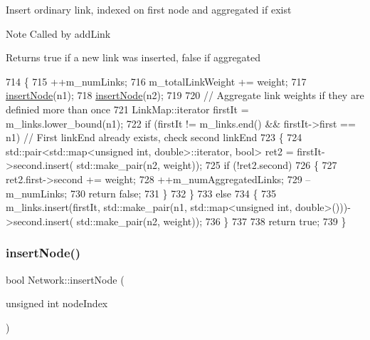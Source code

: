 Insert ordinary link, indexed on first node and aggregated if exist \begin{DoxyNote}{Note}
Called by add\+Link 
\end{DoxyNote}
\begin{DoxyReturn}{Returns}
true if a new link was inserted, false if aggregated 
\end{DoxyReturn}

\begin{DoxyCode}
714 \{
715     ++m\_numLinks;
716     m\_totalLinkWeight += weight;
717     \mbox{\hyperlink{classNetwork_a121d0db867b29c99e6e95ef960fcd56f}{insertNode}}(n1);
718     \mbox{\hyperlink{classNetwork_a121d0db867b29c99e6e95ef960fcd56f}{insertNode}}(n2);
719 
720     \textcolor{comment}{// Aggregate link weights if they are definied more than once}
721     LinkMap::iterator firstIt = m\_links.lower\_bound(n1);
722     \textcolor{keywordflow}{if} (firstIt != m\_links.end() && firstIt->first == n1) \textcolor{comment}{// First linkEnd already exists, check second
       linkEnd}
723     \{
724         std::pair<std::map<unsigned int, double>::iterator, \textcolor{keywordtype}{bool}> ret2 = firstIt->second.insert(
      std::make\_pair(n2, weight));
725         \textcolor{keywordflow}{if} (!ret2.second)
726         \{
727             ret2.first->second += weight;
728             ++m\_numAggregatedLinks;
729             --m\_numLinks;
730             \textcolor{keywordflow}{return} \textcolor{keyword}{false};
731         \}
732     \}
733     \textcolor{keywordflow}{else}
734     \{
735         m\_links.insert(firstIt, std::make\_pair(n1, std::map<unsigned int, double>()))->second.insert(
      std::make\_pair(n2, weight));
736     \}
737 
738     \textcolor{keywordflow}{return} \textcolor{keyword}{true};
739 \}
\end{DoxyCode}
\mbox{\label{classNetwork_a121d0db867b29c99e6e95ef960fcd56f}} 
\subsubsection{\texorpdfstring{insert\+Node()}{insertNode()}}
{\footnotesize\ttfamily bool Network\+::insert\+Node (\begin{DoxyParamCaption}\item[{unsigned int}]{node\+Index }\end{DoxyParamCaption})\hspace{0.3cm}{\ttfamily [protected]}}

